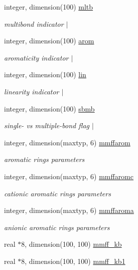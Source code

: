 \begin{DoxyCompactItemize}
integer, dimension(100) \hyperlink{classmerck_a43f295aa5639b7b29334db20fdffd179}{mltb}
\begin{DoxyCompactList}\small\item\em multibond indicator $|$ \end{DoxyCompactList}\item 
integer, dimension(100) \hyperlink{classmerck_aeaa92f814f841125913ead1e6f367fed}{arom}
\begin{DoxyCompactList}\small\item\em aromaticity indicator $|$ \end{DoxyCompactList}\item 
integer, dimension(100) \hyperlink{classmerck_a1dc58cb2ea7c9c13a58dbb8649038a69}{lin}
\begin{DoxyCompactList}\small\item\em linearity indicator $|$ \end{DoxyCompactList}\item 
integer, dimension(100) \hyperlink{classmerck_a58cfa6e65d0d4dad206baafcf012474e}{sbmb}
\begin{DoxyCompactList}\small\item\em single-\/ vs multiple-\/bond flag $|$ \end{DoxyCompactList}\item 
integer, dimension(maxtyp, 6) \hyperlink{classmerck_a8368ed01140ca93e9b201ebe3019ff45}{mmffarom}
\begin{DoxyCompactList}\small\item\em aromatic rings parameters \end{DoxyCompactList}\item 
integer, dimension(maxtyp, 6) \hyperlink{classmerck_a7c40e12504115bebc849894e41dabcec}{mmffaromc}
\begin{DoxyCompactList}\small\item\em cationic aromatic rings parameters \end{DoxyCompactList}\item 
integer, dimension(maxtyp, 6) \hyperlink{classmerck_a9f269cbd52aea1f1401f71c1ec9b3f3f}{mmffaroma}
\begin{DoxyCompactList}\small\item\em anionic aromatic rings parameters \end{DoxyCompactList}\item 
real $\ast$8, dimension(100, 100) \hyperlink{classmerck_ade44b2ba3b64e8afbedcc8872060e9b1}{mmff\-\_\-kb}
\item 
real $\ast$8, dimension(100, 100) \hyperlink{classmerck_a98eafd9057663a6cdfd35d4342e18601}{mmff\-\_\-kb1}

\end{DoxyCompactItemize}
